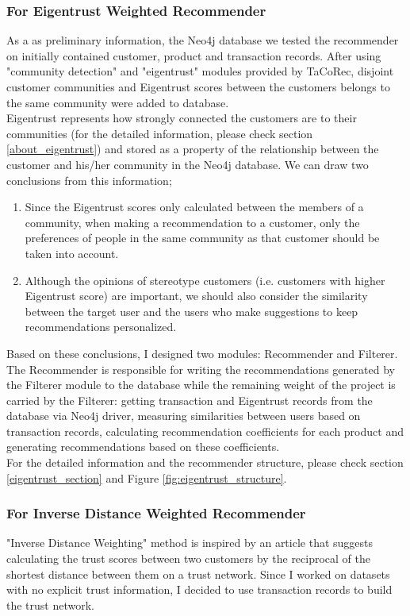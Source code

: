 \subsubsection{For Eigentrust Weighted Recommender}
As a as preliminary information, the Neo4j database we tested the recommender on initially contained customer, product and transaction records. After using "community detection" and "eigentrust" modules provided by TaCoRec, disjoint customer communities and Eigentrust scores between the customers belongs to the same community were added to database.\\

Eigentrust represents how strongly connected the customers are to their communities (for the detailed information, please check section \ref{about_eigentrust}) and stored as a property of the relationship between the customer and his/her community in the Neo4j database. We can draw two conclusions from this information;
\begin{enumerate}
	\item Since the Eigentrust scores only calculated between the members of a community, when making a recommendation to a customer, only the preferences of people in the same community as that customer should be taken into account.
	\item Although the opinions of stereotype customers (i.e. customers with higher Eigentrust score) are important, we should also consider the similarity between the target user and the users who make suggestions to keep recommendations personalized.
\end{enumerate}
Based on these conclusions, I designed two modules: Recommender and Filterer. The Recommender is responsible for writing the recommendations generated by the Filterer module to the database while the remaining weight of the project is carried by the Filterer: getting transaction and Eigentrust records from the database via Neo4j driver, measuring similarities between users based on transaction records, calculating recommendation coefficients for each product and generating recommendations based on these coefficients. \\

For the detailed information and the recommender structure, please check section \ref{eigentrust_section} and Figure \ref{fig:eigentrust_structure}.
\subsubsection{For Inverse Distance Weighted Recommender}
"Inverse Distance Weighting" method is inspired by an article\cite{inverse_article} that suggests calculating the trust scores between two customers by the reciprocal of the shortest distance between them on a trust network. Since I worked on datasets with no explicit trust information, I decided to use transaction records to build the trust network. \\

